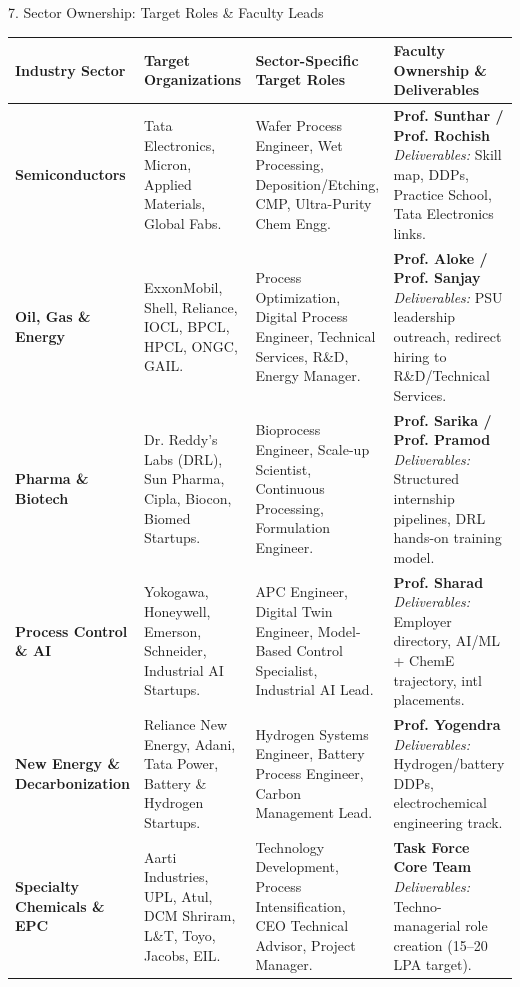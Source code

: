 \documentclass[aspectratio=169, 10pt]{beamer}
\begin{document}
\begin{frame}{7. Sector Ownership: Target Roles \& Faculty Leads}
  \scriptsize
  \renewcommand{\arraystretch}{1.15}
  \centering
  \begin{tabular}{L{2.2cm} L{3.4cm} L{4.4cm} L{4.0cm}}
    \toprule
    \textbf{Industry Sector} & \textbf{Target Organizations} & \textbf{Sector-Specific Target Roles} & \textbf{Faculty Ownership \& Deliverables} \\
    \midrule
    \textbf{Semiconductors} & Tata Electronics, Micron, Applied Materials, Global Fabs. & Wafer Process Engineer, Wet Processing, Deposition/Etching, CMP, Ultra-Purity Chem Engg. & \textbf{Prof. Sunthar / Prof. Rochish} \newline \textit{Deliverables:} Skill map, DDPs, Practice School, Tata Electronics links. \\
    \addlinespace[2pt]
    \textbf{Oil, Gas \& Energy} & ExxonMobil, Shell, Reliance, IOCL, BPCL, HPCL, ONGC, GAIL. & Process Optimization, Digital Process Engineer, Technical Services, R\&D, Energy Manager. & \textbf{Prof. Aloke / Prof. Sanjay} \newline \textit{Deliverables:} PSU leadership outreach, redirect hiring to R\&D/Technical Services. \\
    \addlinespace[2pt]
    \textbf{Pharma \& Biotech} & Dr. Reddy’s Labs (DRL), Sun Pharma, Cipla, Biocon, Biomed Startups. & Bioprocess Engineer, Scale-up Scientist, Continuous Processing, Formulation Engineer. & \textbf{Prof. Sarika / Prof. Pramod} \newline \textit{Deliverables:} Structured internship pipelines, DRL hands-on training model. \\
    \addlinespace[2pt]
    \textbf{Process Control \& AI} & Yokogawa, Honeywell, Emerson, Schneider, Industrial AI Startups. & APC Engineer, Digital Twin Engineer, Model-Based Control Specialist, Industrial AI Lead. & \textbf{Prof. Sharad} \newline \textit{Deliverables:} Employer directory, AI/ML + ChemE trajectory, intl placements. \\
    \addlinespace[2pt]
    \textbf{New Energy \& Decarbonization} & Reliance New Energy, Adani, Tata Power, Battery \& Hydrogen Startups. & Hydrogen Systems Engineer, Battery Process Engineer, Carbon Management Lead. & \textbf{Prof. Yogendra} \newline \textit{Deliverables:} Hydrogen/battery DDPs, electrochemical engineering track. \\
    \addlinespace[2pt]
    \textbf{Specialty Chemicals \& EPC} & Aarti Industries, UPL, Atul, DCM Shriram, L\&T, Toyo, Jacobs, EIL. & Technology Development, Process Intensification, CEO Technical Advisor, Project Manager. & \textbf{Task Force Core Team} \newline \textit{Deliverables:} Techno-managerial role creation (15--20 LPA target). \\
    \bottomrule
  \end{tabular}
\end{frame}
\end{document}
